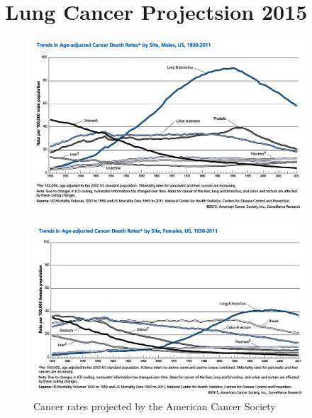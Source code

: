 \newpage
\section*{Lung Cancer Projectsion 2015}

\begin{figure}
  \vspace*{\fill}
  \centering
  \includegraphics[width=0.9\textwidth]{./figures/supplementary/acsMenLungCancer.png}
  \label{fig:acsMen}\par\vfill
  \includegraphics[width=0.9\textwidth]{./figures/supplementary/acsWomenLungCancer.png}
  \caption{Cancer rates projected by the American Cancer Society}
  \label{fig:acsWomen}
\end{figure}


